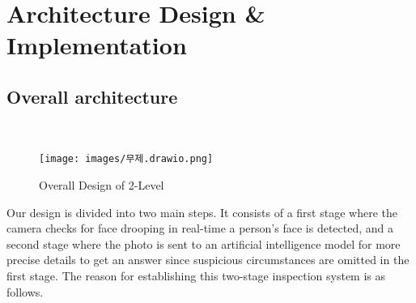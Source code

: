 \usepackage{graphicx}

\section{\textbf{Architecture Design \& Implementation}}



\subsection{\textbf{Overall architecture}} \\

\begin{figure}[h]
    \centering
    \texttt{[image: images/무제.drawio.png]}
    \caption{Overall Design of 2-Level}
\end{figure}

Our design is divided into two main steps. It consists of a first stage where the camera checks for face drooping in real-time a person's face is detected, and a second stage where the photo is sent to an artificial intelligence model for more precise details to get an answer since suspicious circumstances are omitted in the first stage. The reason for establishing this two-stage inspection system is as follows.

